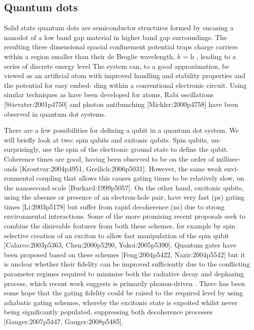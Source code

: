 \subsection{Quantum dots}

Solid state quantum dots are semiconductor structures formed by encasing a nanodot of a low band gap material in higher band gap surroundings. The resulting three dimensional spacial confinement potential traps charge carriers within a region smaller than their de Broglie wavelength, λ = h , leading to a series of discrete energy level The system can, to a good approximation, be viewed as an artificial atom with improved handling and stability properties and the potential for easy embed- ding within a conventional electronic circuit. Using similar techniques as have been developed for atoms, Rabi oscillations [Stievater:2001p4750] and photon antibunching [Michler:2000p4758] have been observed in quantum dot systems.

There are a few possibilities for defining a qubit in a quantum dot system. We will briefly look at two: spin qubits and exitonic qubits. Spin qubits, un- surprisingly, use the spin of the electronic ground state to define the qubit. Coherence times are good, having been observed to be on the order of millisec- onds [Kroutvar:2004p4951, Greilich:2006p5031]. However, the same weak envi- ronmental coupling that allows this causes gating times to be relatively slow, on the nanosecond scale [Burkard:1999p5057]. On the other hand, excitonic qubits, using the absense or presence of an electron-hole pair, have very fast (ps) gating times [Li:2003p5178] but suffer from rapid decoherence (ns) due to strong environmental interactions. Some of the more promising recent proposals seek to combine the disireable features from both these schemes, for example by spin selective creation of an exciton to allow fast manipulation of the spin qubit [Calarco:2003p5363, Chen:2000p5290, Yokoi:2005p5390]. Quantum gates have been proposed based on these schemes [Feng:2004p5422, Nazir:2004p5542] but it is unclear whether their fidelity can be improved sufficiently due to the conflicting parameter regimes required to minimise both the radiative decay and dephasing process, which recent work suggests is primarily phonon-driven
. There has been some hope that the gating fidelity could be raised to the required level by using adiabatic gating schemes, whereby the excitonic state is expoited whilst never being significantly populated, suppressing both decoherence processes [Gauger:2007p5447, Gauger:2008p5485].


